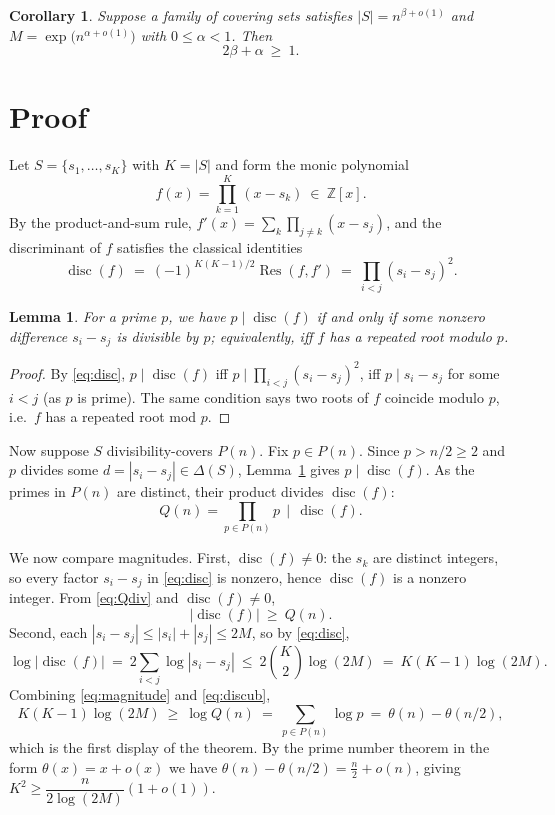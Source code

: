 \documentclass[11pt]{article}
\newtheorem{lemma}{Lemma}
\newtheorem{corollary}{Corollary}
\theoremstyle{definition}
\theoremstyle{remark}
\DeclareMathOperator{\disc}{disc}
\DeclareMathOperator{\Res}{Res}
\begin{document}
\begin{corollary}\label{cor:exponents}
Suppose a family of covering sets satisfies $|S|=n^{\beta+o(1)}$ and
$M=\exp\!\bigl(n^{\alpha+o(1)}\bigr)$ with $0\le\alpha<1$. Then
\[
  2\beta+\alpha\ \ge\ 1 .
\]
\end{corollary}

\section{Proof}

Let $S=\{s_1,\dots,s_K\}$ with $K=|S|$ and form the monic polynomial
\[
  f(x)=\prod_{k=1}^{K}(x-s_k)\ \in\ \mathbb Z[x].
\]
By the product-and-sum rule, $f'(x)=\sum_{k}\prod_{j\ne k}(x-s_j)$, and the
discriminant of $f$ satisfies the classical identities
\begin{equation}\label{eq:disc}
  \disc(f)\ =\ (-1)^{K(K-1)/2}\Res(f,f')\ =\ \prod_{i<j}(s_i-s_j)^2 .
\end{equation}

\begin{lemma}\label{lem:equiv}
For a prime $p$, we have $p\mid \disc(f)$ if and only if some nonzero difference
$s_i-s_j$ is divisible by $p$; equivalently, iff $f$ has a repeated root modulo
$p$.
\end{lemma}

\begin{proof}
By \eqref{eq:disc}, $p\mid\disc(f)$ iff $p\mid\prod_{i<j}(s_i-s_j)^2$, iff
$p\mid s_i-s_j$ for some $i<j$ (as $p$ is prime). The same condition says two
roots of $f$ coincide modulo $p$, i.e.\ $f$ has a repeated root mod $p$.
\end{proof}

Now suppose $S$ divisibility-covers $P(n)$. Fix $p\in P(n)$. Since $p>n/2\ge 2$
and $p$ divides some $d=|s_i-s_j|\in\Delta(S)$, Lemma~\ref{lem:equiv} gives
$p\mid\disc(f)$. As the primes in $P(n)$ are distinct, their product divides
$\disc(f)$:
\begin{equation}\label{eq:Qdiv}
  Q(n)=\prod_{p\in P(n)}p\ \ \Big|\ \ \disc(f).
\end{equation}

We now compare magnitudes. First, $\disc(f)\ne 0$: the $s_k$ are distinct
integers, so every factor $s_i-s_j$ in \eqref{eq:disc} is nonzero, hence
$\disc(f)$ is a nonzero integer. From \eqref{eq:Qdiv} and $\disc(f)\ne 0$,
\begin{equation}\label{eq:magnitude}
  |\disc(f)|\ \ge\ Q(n).
\end{equation}
Second, each $|s_i-s_j|\le |s_i|+|s_j|\le 2M$, so by \eqref{eq:disc},
\begin{equation}\label{eq:discub}
  \log|\disc(f)|\ =\ 2\sum_{i<j}\log|s_i-s_j|\ \le\ 2\binom{K}{2}\log(2M)\ =\ K(K-1)\log(2M).
\end{equation}
Combining \eqref{eq:magnitude} and \eqref{eq:discub},
\[
  K(K-1)\log(2M)\ \ge\ \log Q(n)\ =\ \sum_{p\in P(n)}\log p\ =\ \theta(n)-\theta(n/2),
\]
which is the first display of the theorem. By the prime number theorem in the
form $\theta(x)=x+o(x)$ we have $\theta(n)-\theta(n/2)=\tfrac n2+o(n)$, giving
$K^2\ge \dfrac{n}{2\log(2M)}(1+o(1))$.
\end{document}
